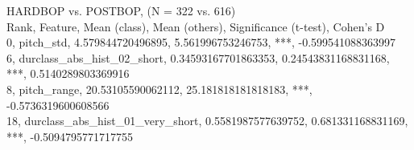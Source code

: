 HARDBOP vs. POSTBOP, (N = 322 vs. 616)\\
Rank, Feature, Mean (class), Mean (others), Significance (t-test), Cohen's D\\
0, pitch_std, 4.579844720496895, 5.561996753246753, ***, -0.599541088363997\\
6, durclass_abs_hist_02_short, 0.34593167701863353, 0.24543831168831168, ***, 0.5140289803369916\\
8, pitch_range, 20.53105590062112, 25.181818181818183, ***, -0.5736319600608566\\
18, durclass_abs_hist_01_very_short, 0.5581987577639752, 0.681331168831169, ***, -0.5094795771717755\\
